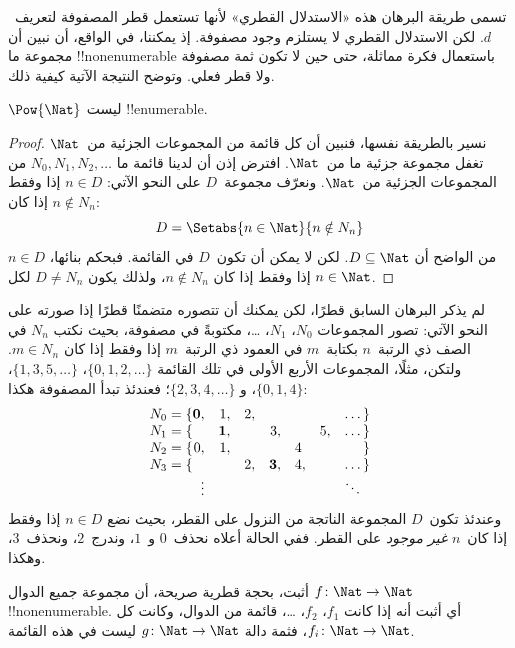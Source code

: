 \documentclass[../../../include/open-logic-section]{subfiles}
\begin{document}
\begin{explain}
تسمى طريقة البرهان هذه «الاستدلال القطري» لأنها تستعمل قطر المصفوفة
لتعريف~$d$. لكن الاستدلال القطري لا يستلزم وجود مصفوفة. إذ يمكننا،
في الواقع، أن نبين أن مجموعة ما !!{nonenumerable} باستعمال فكرة
مماثلة، حتى حين لا تكون ثمة مصفوفة ولا قطر فعلي. وتوضح النتيجة الآتية
كيفية ذلك.
\end{explain}

\begin{thm}
$\Pow{\Nat}$ ليست !!{enumerable}.
\end{thm}

\begin{proof}
نسير بالطريقة نفسها، فنبين أن كل قائمة من المجموعات الجزئية من~$\Nat$
تغفل مجموعة جزئية ما من~$\Nat$. افترض إذن أن لدينا قائمة ما
$N_0, N_1, N_2, \ldots$ من المجموعات الجزئية من~$\Nat$. ونعرّف
مجموعة~$D$ على النحو الآتي: $n \in D$ إذا وفقط إذا كان $n \notin
N_{n}$:
\[
D = \Setabs{n \in \Nat}{n \notin N_n}
\]
من الواضح أن $D\subseteq \Nat$. لكن لا يمكن أن تكون~$D$ في القائمة.
فبحكم بنائها، $n \in D$ إذا وفقط إذا كان $n\notin N_n$، ولذلك يكون
$D \neq N_n$ لكل $n \in \Nat$.
\end{proof}

\begin{explain}
لم يذكر البرهان السابق قطرًا، لكن يمكنك أن تتصوره متضمنًا قطرًا إذا
صورته على النحو الآتي: تصور المجموعات $N_0$، $N_1$، \dots، مكتوبةً
في مصفوفة، بحيث نكتب $N_n$ في الصف ذي الرتبة~$n$ بكتابة~$m$ في
العمود ذي الرتبة~$m$ إذا وفقط إذا كان $m \in N_n$. ولتكن، مثلًا،
المجموعات الأربع الأولى في تلك القائمة
$\{0,1,2,\dots\}$، $\{1, 3, 5, \dots\}$، $\{0,1,4\}$، و
$\{2,3,4,\dots\}$؛ فعندئذ تبدأ المصفوفة هكذا:
\[
\begin{array}{r@{}rrrrrrr}
  N_0 = \{ & \mathbf{0}, & 1, & 2, & & & & \dots\}\\
  N_1 = \{ &  & \mathbf{1}, &  & 3, &  & 5, & \dots\}\\
  N_2 = \{ & 0, & 1, &  &  & 4\phantom{,} &  & \}\\
  N_3 = \{ &  &  & 2, & \mathbf{3}, & 4, & & \dots\}\\
  &\vdots & & & & & & \ddots\phantom{\}}
  \end{array}
\]
وعندئذ تكون~$D$ المجموعة الناتجة من النزول على القطر، بحيث نضع
$n \in D$ إذا وفقط إذا كان~$n$ \emph{غير موجود} على القطر. ففي
الحالة أعلاه نحذف~$0$ و~$1$، وندرج~$2$، ونحذف~$3$، وهكذا.
\end{explain}

\begin{prob}
أثبت، بحجة قطرية صريحة، أن مجموعة جميع الدوال $f \colon \Nat \to
\Nat$ !!{nonenumerable}. أي أثبت أنه إذا كانت $f_1$، $f_2$، \dots،
قائمة من الدوال، وكانت كل $f_i\colon \Nat \to \Nat$، فثمة دالة
$g \colon \Nat \to \Nat$ ليست في هذه القائمة.
\end{prob}
\end{document}
